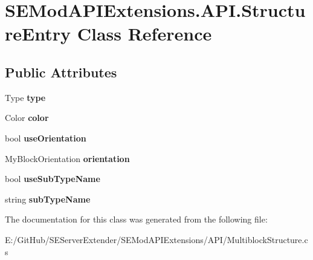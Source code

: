 \hypertarget{class_s_e_mod_a_p_i_extensions_1_1_a_p_i_1_1_structure_entry}{}\section{S\+E\+Mod\+A\+P\+I\+Extensions.\+A\+P\+I.\+Structure\+Entry Class Reference}
\label{class_s_e_mod_a_p_i_extensions_1_1_a_p_i_1_1_structure_entry}
\subsection*{Public Attributes}
\begin{DoxyCompactItemize}
\item 
\hypertarget{class_s_e_mod_a_p_i_extensions_1_1_a_p_i_1_1_structure_entry_a6641ee53eff0904209e829a0141ca721}{}Type {\bfseries type}\label{class_s_e_mod_a_p_i_extensions_1_1_a_p_i_1_1_structure_entry_a6641ee53eff0904209e829a0141ca721}

\item 
\hypertarget{class_s_e_mod_a_p_i_extensions_1_1_a_p_i_1_1_structure_entry_aa26444b07d410cc191bc6f5cec0395e9}{}Color {\bfseries color}\label{class_s_e_mod_a_p_i_extensions_1_1_a_p_i_1_1_structure_entry_aa26444b07d410cc191bc6f5cec0395e9}

\item 
\hypertarget{class_s_e_mod_a_p_i_extensions_1_1_a_p_i_1_1_structure_entry_a7025bea3ec17824cd9c25b2ee2aa93b5}{}bool {\bfseries use\+Orientation}\label{class_s_e_mod_a_p_i_extensions_1_1_a_p_i_1_1_structure_entry_a7025bea3ec17824cd9c25b2ee2aa93b5}

\item 
\hypertarget{class_s_e_mod_a_p_i_extensions_1_1_a_p_i_1_1_structure_entry_af4699f5150133ff39b5fa271f860afe5}{}My\+Block\+Orientation {\bfseries orientation}\label{class_s_e_mod_a_p_i_extensions_1_1_a_p_i_1_1_structure_entry_af4699f5150133ff39b5fa271f860afe5}

\item 
\hypertarget{class_s_e_mod_a_p_i_extensions_1_1_a_p_i_1_1_structure_entry_a1fb9b11565af6e3ef6fea03ce80c8a62}{}bool {\bfseries use\+Sub\+Type\+Name}\label{class_s_e_mod_a_p_i_extensions_1_1_a_p_i_1_1_structure_entry_a1fb9b11565af6e3ef6fea03ce80c8a62}

\item 
\hypertarget{class_s_e_mod_a_p_i_extensions_1_1_a_p_i_1_1_structure_entry_aee8d0d7bf908f99a0e8cbd12e1ce4a03}{}string {\bfseries sub\+Type\+Name}\label{class_s_e_mod_a_p_i_extensions_1_1_a_p_i_1_1_structure_entry_aee8d0d7bf908f99a0e8cbd12e1ce4a03}

\end{DoxyCompactItemize}


The documentation for this class was generated from the following file\+:\begin{DoxyCompactItemize}
\item 
E\+:/\+Git\+Hub/\+S\+E\+Server\+Extender/\+S\+E\+Mod\+A\+P\+I\+Extensions/\+A\+P\+I/Multiblock\+Structure.\+cs\end{DoxyCompactItemize}
